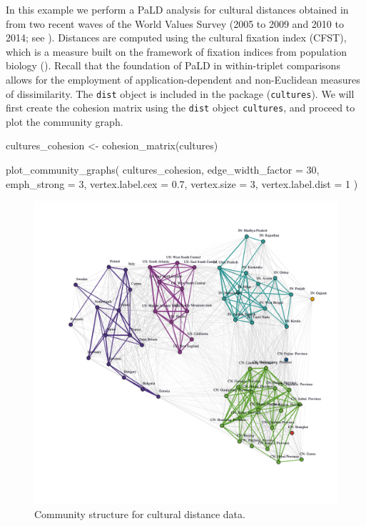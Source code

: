In this example we perform a PaLD analysis for cultural distances
obtained in \citet{muthukrishna2020beyond} from two recent waves of the
World Values Survey (2005 to 2009 and 2010 to 2014; see
\citet{inglehart2014world}). Distances are computed using the cultural
fixation index (CFST), which is a measure built on the framework of
fixation indices from population biology
(\citet{bell2009culture,cavalli1994history}). Recall that the foundation
of PaLD in within-triplet comparisons allows for the employment of
application-dependent and non-Euclidean measures of dissimilarity. The
\texttt{dist} object is included in the  package
(\texttt{cultures}). We will first create the cohesion matrix using the
\texttt{dist} object \texttt{cultures}, and proceed to plot the
community graph.

\begin{Schunk}
\begin{Sinput}
cultures_cohesion <- cohesion_matrix(cultures)
\end{Sinput}
\end{Schunk}

\begin{Schunk}
\begin{Sinput}
plot_community_graphs(
  cultures_cohesion,
  edge_width_factor = 30,
  emph_strong = 3,
  vertex.label.cex = 0.7,
  vertex.size = 3,
  vertex.label.dist = 1
)
\end{Sinput}
\end{Schunk}

\begin{Schunk}
\begin{figure}[H]
\includegraphics[width=5.5in,trim=0in 5in 0in 3in,clip]{fig7} \caption[Community structure for cultural distance data]{Community structure for cultural distance data.}\label{fig:figculture}
\end{figure}
\end{Schunk}

